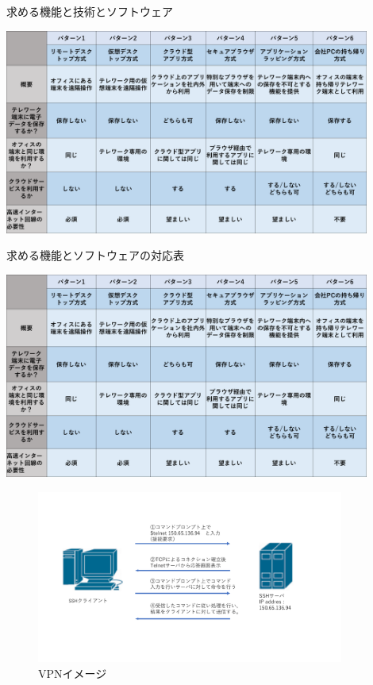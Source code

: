 \documentclass[11pt,a4j,titlepage]{jreport}
\begin{document}
\begin{table}[h]
    \caption{求める機能と技術とソフトウェア}
    \centering
    \includegraphics*[width=0.9\textwidth,page=8]{graphs/telework_list.pdf}
    \label{spec_and_technic}
\end{table}
\begin{table}[h]
    \caption{求める機能とソフトウェアの対応表}
    \centering
    \includegraphics*[width=0.9\textwidth,page=9]{graphs/telework_list.pdf}
    \label{software}
\end{table}

\begin{figure}[h]
    \centering
    \includegraphics*[width=0.9\textwidth,page=20]{graphs/network_archtecture.pdf}
    \caption{VPNイメージ}
    \label{VPN_image}
\end{figure}
\end{document}
